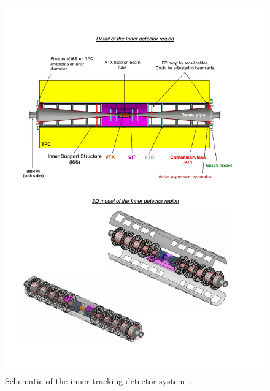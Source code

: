 \begin{figure}[h!]
    \centering
        \includegraphics[width=0.8\hsize]{Integration/fig/Inner_Detector_Schematic.pdf}
    \caption{Schematic of the inner tracking detector system~\cite{ild:bib:inner_detector_integration}.}
    \label{ILD:fig:inner_detector_schematic}
\end{figure}

